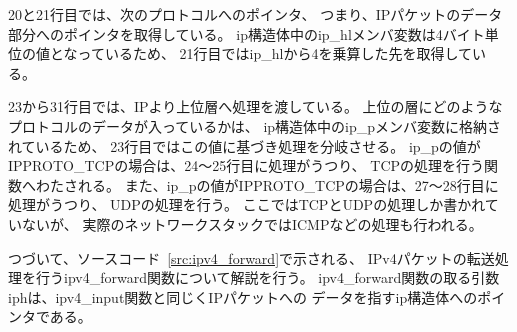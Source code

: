 20と21行目では、次のプロトコルへのポインタ、
つまり、IPパケットのデータ部分へのポインタを取得している。
ip構造体中のip\_hlメンバ変数は4バイト単位の値となっているため、
21行目ではip\_hlから4を乗算した先を取得している。

23から31行目では、IPより上位層へ処理を渡している。
上位の層にどのようなプロトコルのデータが入っているかは、
ip構造体中のip\_pメンバ変数に格納されているため、
23行目ではこの値に基づき処理を分岐させる。
ip\_pの値がIPPROTO\_TCPの場合は、24〜25行目に処理がうつり、
TCPの処理を行う関数へわたされる。
また、ip\_pの値がIPPROTO\_TCPの場合は、27〜28行目に処理がうつり、
UDPの処理を行う。
ここではTCPとUDPの処理しか書かれていないが、
実際のネットワークスタックではICMPなどの処理も行われる。

つづいて、ソースコード~\ref{src:ipv4_forward}で示される、
IPv4パケットの転送処理を行うipv4\_forward関数について解説を行う。
ipv4\_forward関数の取る引数iphは、ipv4\_input関数と同じくIPパケットへの
データを指すip構造体へのポインタである。

